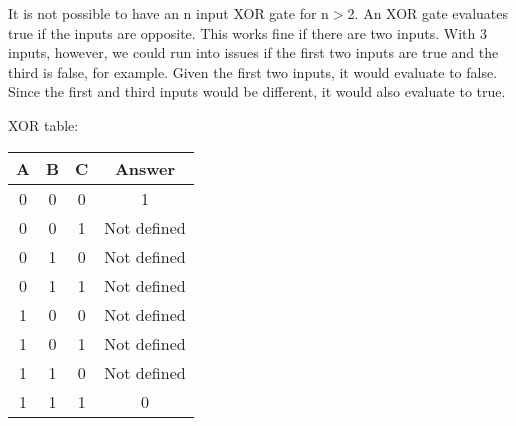 \documentclass[letterpaper,10pt,titlepage]{article}
\begin{document}
\begin{enumerate}
  It is not possible to have an n input XOR gate for n$>$2.
  An XOR gate evaluates true if the inputs are opposite.  This works fine if there are two inputs.
  With 3 inputs, however, we could run into issues if the first two inputs are true and the third is false, for example.
  Given the first two inputs, it would evaluate to false.  Since the first and third inputs would be different, it would also evaluate to true.
  
  XOR table:
\begin{tabular}{c|c|c|c}
A & B & C & Answer \\
\hline
0 & 0 & 0 & 1\\
0 & 0 & 1 & Not defined\\
0 & 1 & 0 & Not defined\\
0 & 1 & 1 & Not defined\\
1 & 0 & 0 & Not defined\\
1 & 0 & 1 & Not defined\\
1 & 1 & 0 & Not defined\\
1 & 1 & 1 & 0\\
\end{tabular}
  
\end{enumerate}
\end{document}
